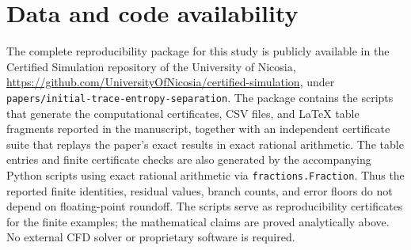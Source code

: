 \documentclass[a4paper,fleqn, sort&compress]{cas-sc}
\theoremstyle{remark}
\theoremstyle{definition}
\begin{document}
\section*{Data and code availability}

The complete reproducibility package for this study is publicly
available in the Certified Simulation repository of the University of
Nicosia, \url{https://github.com/UniversityOfNicosia/certified-simulation},
under \texttt{papers/initial-trace-entropy-separation}.  The package
contains the scripts that generate the computational certificates, CSV
files, and LaTeX table fragments reported in the manuscript, together
with an independent certificate suite that replays the paper's exact
results in exact rational arithmetic. The table entries and finite certificate checks are also generated by the accompanying Python scripts using exact rational arithmetic via \texttt{fractions.Fraction}.  Thus the reported finite identities, residual values, branch counts, and error floors do not depend on floating-point roundoff.  The scripts serve as reproducibility certificates for the finite examples; the mathematical claims are proved analytically above.  No external CFD solver or proprietary software is required.





\FloatBarrier
% 
%




\end{document}
